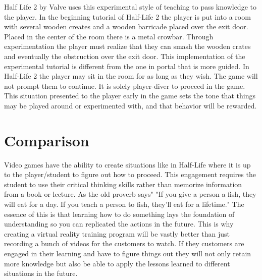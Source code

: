 \documentclass[onecolumn, draftclsnofoot,10pt, compsoc]{IEEEtran}
\begin{document}
Half Life 2 by Valve uses this experimental style of teaching to pass knowledge to the player. In the beginning tutorial of Half-Life 2 the player is put into a room with several wooden creates and a wooden barricade placed over the exit door. Placed in the center of the room there is a metal crowbar. Through experimentation the player must realize that they can smash the wooden crates and eventually the obstruction over the exit door. This implementation of the experimental tutorial is different from the one in portal that is more guided. In Half-Life 2 the player may sit in the room for as long as they wish. The game will not prompt them to continue. It is solely player-diver to proceed in the game. This situation presented to the player early in the game sets the tone that things may be played around or experimented with, and that behavior will be rewarded.
\cite{hl2}

\section{Comparison}
Video games have the ability to create situations like in Half-Life where it is up to the player/student to figure out how to proceed. This engagement requires the student to use their critical thinking skills rather than memorize information from a book or lecture. As the old proverb says" "If you give a person a fish, they will eat for a day. If you teach a person to fish, they'll eat for a lifetime." The essence of this is that learning how to do something lays the foundation of understanding so you can replicated the actions in the future. This is why creating a virtual reality training program will be vastly better than just recording a bunch of videos for the customers to watch. If they customers are engaged in their learning and have to figure things out they will not only retain more knowledge but also be able to apply the lessons learned to different situations in the future.
\end{document}
